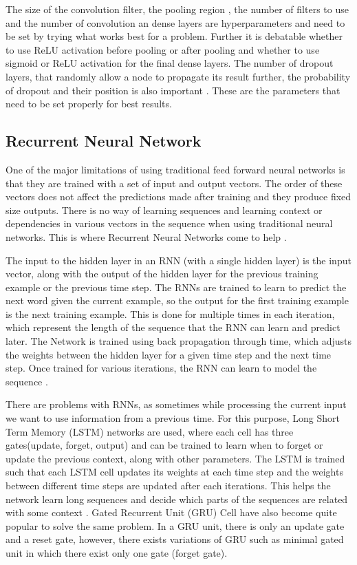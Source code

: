\documentclass[a4paper]{article}
\begin{document}
The size of the convolution filter, the pooling region , the number of filters to use and the number of convolution an dense layers are hyperparameters and need to be set by trying what works best for a problem. Further it is debatable whether to use ReLU activation before pooling or after pooling and whether to use sigmoid or ReLU activation for the final dense layers. The number of dropout layers, that randomly allow a node to propagate its result further, the probability of dropout and their position is also important \cite{wiki-cnn}.
These are the parameters that need to be set properly for best results. 
 
\subsection{Recurrent Neural Network}
One of the major limitations of using traditional feed forward neural networks is that they are trained with a set of input and output vectors. The order of these vectors does not affect the predictions made after training and they produce fixed size outputs. There is no way of learning sequences and learning context or dependencies in various vectors in the sequence when using traditional neural networks. This is where Recurrent Neural Networks come to help \cite{karpathy-rnn}.

The input to the hidden layer in an RNN (with a single hidden layer) is the input vector, along with the output of the hidden layer for the previous training example or the previous time step. The RNNs are trained to learn to predict the next word given the current example, so the output for the first training example is the next training example. This is done for multiple times in each iteration, which represent the length of the sequence that the RNN can learn and predict later. The Network is trained using back propagation through time, which adjusts the weights between the hidden layer for a given time step and the next time step. Once trained for various iterations, the RNN can learn to model the sequence \cite{wiki-rnn}.

There are problems with RNNs, as sometimes while processing the current input we want to use information from a previous time. For this purpose, Long Short Term Memory (LSTM) networks are used, where each cell has three gates(update, forget, output) and can be trained to learn when to forget or update the previous context, along with other parameters. The LSTM is trained such that each LSTM cell updates its weights at each time step and the weights between different time steps are updated after each iterations. This helps the network learn long sequences and decide which parts of the sequences are related with some context \cite{iamtrask-lstm} \cite{wiki-lstm}. Gated Recurrent Unit (GRU) Cell have also become quite popular to solve the same problem. In a GRU unit, there is only an update gate and a reset gate, however, there exists variations of GRU such as minimal gated unit in which there exist only one gate (forget gate).
\end{document}
